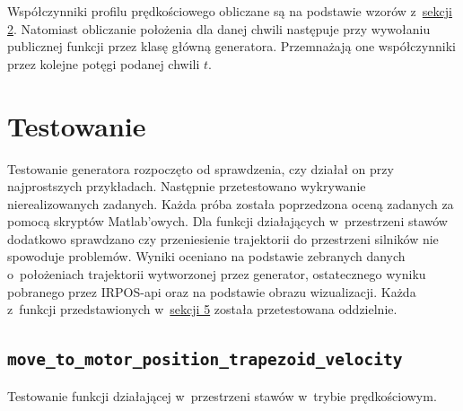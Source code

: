 \documentclass[a4paper, 12pt]{article}
\begin{document}
	\par Współczynniki profilu prędkościowego obliczane są na podstawie wzorów z~\hyperref[sec:math]{sekcji 2}. Natomiast obliczanie położenia dla danej chwili następuje przy wywołaniu publicznej funkcji przez klasę główną generatora. Przemnażają one współczynniki przez kolejne potęgi podanej chwili $t$.
	
	\section{Testowanie}
	Testowanie generatora rozpoczęto od sprawdzenia, czy działał on przy najprostszych przykładach. Następnie przetestowano wykrywanie nierealizowanych zadanych. Każda próba została poprzedzona oceną zadanych za pomocą skryptów Matlab'owych. Dla funkcji działających w~przestrzeni stawów dodatkowo sprawdzano czy przeniesienie trajektorii do przestrzeni silników nie spowoduje problemów. Wyniki oceniano na podstawie zebranych danych o~położeniach trajektorii wytworzonej przez generator, ostatecznego wyniku pobranego przez IRPOS-api oraz na podstawie obrazu wizualizacji. Każda z~funkcji przedstawionych w~\hyperref[sec:api]{sekcji 5} została przetestowana oddzielnie.
	\subsection{\texttt{move\_to\_motor\_position\_trapezoid\_velocity}}
	Testowanie funkcji działającej w~przestrzeni stawów w~trybie prędkościowym.
\end{document}
